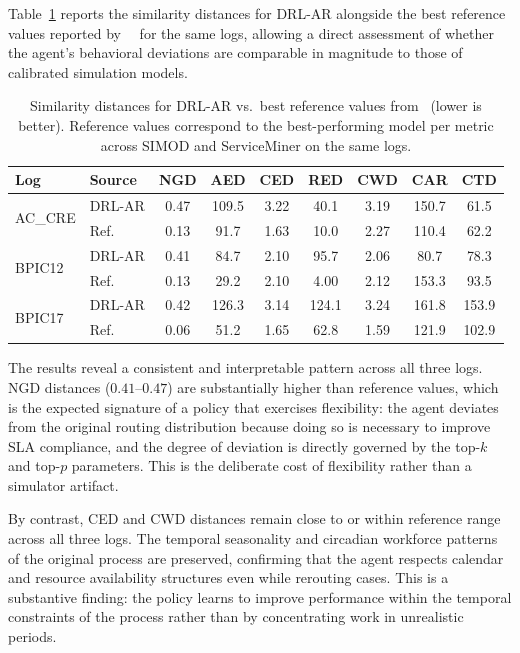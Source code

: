 \documentclass[runningheads]{llncs}
\begin{document}
Table~\ref{tab:similarity} reports the similarity distances for 
DRL-AR alongside the best reference values reported 
by~\citeauthor{framework_for_measuring_the_quality_of_business_process_simulation_models}~\cite{framework_for_measuring_the_quality_of_business_process_simulation_models}  
for the same logs, allowing a direct assessment of whether the 
agent's behavioral deviations are comparable in magnitude to 
those of calibrated simulation models.
%
\begin{table}[!ht]
\centering
\small
\renewcommand{\arraystretch}{1.1}
\setlength{\tabcolsep}{3.5pt}
\begin{tabular}{llccccccc}
\hline
\textbf{Log} & \textbf{Source} & NGD & AED & CED & RED & 
CWD & CAR & CTD \\
\hline
\multirow{2}{*}{AC\_CRE}
  & DRL-AR & 0.47 & 109.5 & 3.22 & 40.1  & 3.19 & 150.7 & 61.5 \\
  & Ref.   & 0.13 & 91.7  & 1.63 & 10.0  & 2.27 & 110.4 & 62.2 \\
\hline
\multirow{2}{*}{BPIC12}
  & DRL-AR & 0.41 & 84.7  & 2.10 & 95.7  & 2.06 & 80.7  & 78.3 \\
  & Ref.   & 0.13 & 29.2  & 2.10 & 4.00  & 2.12 & 153.3 & 93.5 \\
\hline
\multirow{2}{*}{BPIC17}
  & DRL-AR & 0.42 & 126.3 & 3.14 & 124.1 & 3.24 & 161.8 & 153.9 \\
  & Ref.   & 0.06 & 51.2  & 1.65 & 62.8  & 1.59 & 121.9 & 102.9 \\
\hline
\end{tabular}
\caption{Similarity distances for DRL-AR vs.\ best reference 
values from~\cite{framework_for_measuring_the_quality_of_business_process_simulation_models}
(lower is better). Reference values correspond to the 
best-performing model per metric across SIMOD and ServiceMiner 
on the same logs.}
\label{tab:similarity}
\end{table}

The results reveal a consistent and interpretable pattern across 
all three logs. NGD distances ($0.41$--$0.47$) are substantially 
higher than reference values, which is the expected signature of 
a policy that exercises flexibility: the agent deviates from the 
original routing distribution because doing so is necessary to 
improve SLA compliance, and the degree of deviation is directly 
governed by the top-$k$ and top-$p$ parameters. This is the 
deliberate cost of flexibility rather than a simulator artifact.

By contrast, CED and CWD distances remain close to or within 
reference range across all three logs. The temporal seasonality 
and circadian workforce patterns of the original process are 
preserved, confirming that the agent respects calendar and 
resource availability structures even while rerouting cases. 
This is a substantive finding: the policy learns to improve 
performance within the temporal constraints of the process 
rather than by concentrating work in unrealistic periods.
\end{document}
